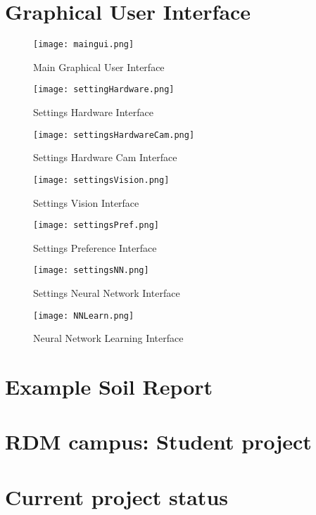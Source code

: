 \documentclass[11pt,fleqn,,a4paper,twoside,openright]{book}
\begin{document}
\chapter{Graphical User Interface}
\begin{figure}[h]
	\texttt{[image: maingui.png]}
	\caption{Main Graphical User Interface}
\end{figure}
\begin{figure}[h]
	\texttt{[image: settingHardware.png]}
	\caption{Settings Hardware Interface}
\end{figure}
\begin{figure}[h]
	\texttt{[image: settingsHardwareCam.png]}
	\caption{Settings Hardware Cam Interface}
\end{figure}
\begin{figure}[h]
	\texttt{[image: settingsVision.png]}
	\caption{Settings Vision Interface}
\end{figure}
\begin{figure}[h]
	\texttt{[image: settingsPref.png]}
	\caption{Settings Preference Interface}
\end{figure}
\begin{figure}[h]
	\texttt{[image: settingsNN.png]}
	\caption{Settings Neural Network Interface}
\end{figure}
\begin{figure}[h]
	\texttt{[image: NNLearn.png]}
	\caption{Neural Network Learning Interface}
\end{figure}

\chapter{Example Soil Report}


\chapter{RDM campus: Student project}\label{RDM_Campus}

\chapter{Current project status}

\end{document}
